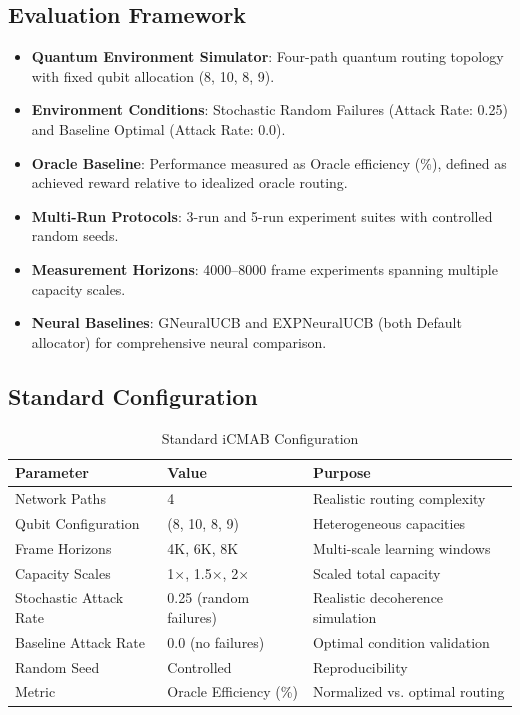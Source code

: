 \documentclass[12pt,a4paper]{article}
\begin{document}
\subsection{Evaluation Framework}
\begin{itemize}
\item \textbf{Quantum Environment Simulator}: Four-path quantum routing topology with fixed qubit allocation (8, 10, 8, 9).
\item \textbf{Environment Conditions}: Stochastic Random Failures (Attack Rate: 0.25) and Baseline Optimal (Attack Rate: 0.0).
\item \textbf{Oracle Baseline}: Performance measured as Oracle efficiency (\%), defined as achieved reward relative to idealized oracle routing.
\item \textbf{Multi-Run Protocols}: 3-run and 5-run experiment suites with controlled random seeds.
\item \textbf{Measurement Horizons}: 4000--8000 frame experiments spanning multiple capacity scales.
\item \textbf{Neural Baselines}: GNeuralUCB and EXPNeuralUCB (both Default allocator) for comprehensive neural comparison.
\end{itemize}

\subsection{Standard Configuration}
\begin{table}[H]
\centering
\caption{Standard iCMAB Configuration}
\begin{tabular}{@{}lll@{}}
\toprule
\textbf{Parameter} & \textbf{Value} & \textbf{Purpose} \\
\midrule
Network Paths & 4 & Realistic routing complexity \\
Qubit Configuration & (8, 10, 8, 9) & Heterogeneous capacities \\
Frame Horizons & 4K, 6K, 8K & Multi-scale learning windows \\
Capacity Scales & 1$\times$, 1.5$\times$, 2$\times$ & Scaled total capacity \\
Stochastic Attack Rate & 0.25 (random failures) & Realistic decoherence simulation \\
Baseline Attack Rate & 0.0 (no failures) & Optimal condition validation \\
Random Seed & Controlled & Reproducibility \\
Metric & Oracle Efficiency (\%) & Normalized vs. optimal routing \\
\bottomrule
\end{tabular}
\end{table}
\end{document}
